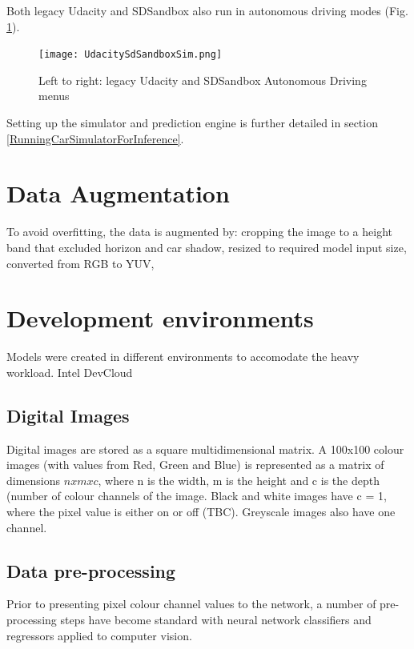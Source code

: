 Both legacy Udacity and SDSandbox also run in autonomous driving modes (Fig. \ref{fig:UdacitySdSandboxAutonomous}).

\begin{figure}[h!]
\centering
\texttt{[image: UdacitySdSandboxSim.png]}
\caption{Left to right: legacy Udacity and SDSandbox Autonomous Driving menus}
\label{fig:UdacitySdSandboxAutonomous}
\end{figure}

Setting up the simulator and prediction engine is further detailed in section \ref{RunningCarSimulatorForInference}.

\section{Data Augmentation}
To avoid overfitting, the data is augmented by: cropping the image to a height band that excluded horizon and car shadow, resized to required model input size, converted from RGB to YUV, 


\section{Development environments}

Models were created in different environments to accomodate the heavy workload. Intel DevCloud 

\subsection{Digital Images}
Digital images are stored as a square multidimensional matrix. A 100x100 colour images (with values from Red, Green and Blue) is represented as a matrix of dimensions $n x m x c$, where n is the width, m is the height and c is the depth (number of colour channels of the image. Black and white images have c = 1, where the pixel value is either on or off (TBC). Greyscale images also have one channel.

\subsection{Data pre-processing}
Prior to presenting pixel colour channel values to the network, a number of pre-processing steps have become standard with neural network classifiers and regressors applied to computer vision.


